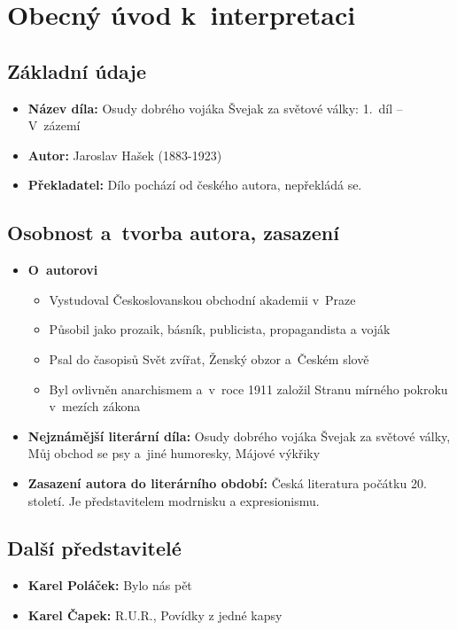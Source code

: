 \section{Obecný úvod k~interpretaci}

\subsection{Základní údaje}
\begin{itemize}
    \item \textbf{Název díla:} Osudy dobrého vojáka Švejak za světové války: 1.~díl -- V~zázemí
    \item \textbf{Autor:} Jaroslav Hašek (1883-1923)
    \item \textbf{Překladatel:} Dílo pochází od českého autora, nepřekládá se.
\end{itemize}

\subsection{Osobnost a~tvorba autora, zasazení}
\begin{itemize}
    \item \textbf{O~autorovi}\cite{wiki:Jaroslav_Hasek}\cite[62]{didaktis:literatura3}
    \begin{itemize}
        \item Vystudoval Českoslovanskou obchodní akademii v~Praze
        \item Působil jako prozaik, básník, publicista, propagandista a voják
        \item Psal do časopisů Svět zvířat, Ženský obzor a~Českém slově
        \item Byl ovlivněn anarchismem a~v~roce 1911 založil Stranu mírného pokroku v~mezích zákona
    \end{itemize}
    \item \textbf{Nejznámější literární díla:} Osudy dobrého vojáka Švejak za světové války, Můj obchod se psy a~jiné humoresky, Májové výkřiky
    \item \textbf{Zasazení autora do literárního období:} Česká literatura počátku 20. století. Je představitelem modrnisku a expresionismu.
\end{itemize}

\subsection{Další představitelé}\cite{didaktis:literatura3}
\begin{itemize}
    \item \textbf{Karel Poláček:} Bylo nás pět
    \item \textbf{Karel Čapek:} R.U.R., Povídky z jedné kapsy
\end{itemize}

